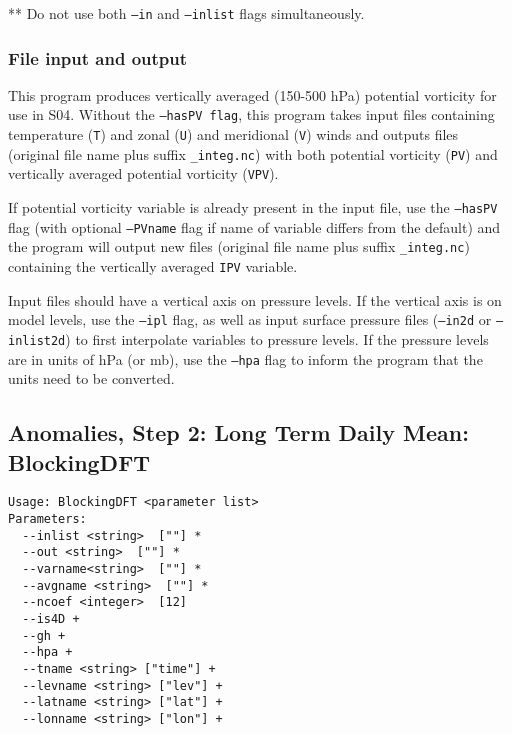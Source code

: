 \documentclass{article}
\begin{document}
** Do not use both \texttt{--in} and \texttt{--inlist} flags simultaneously.



\subsubsection{File input and output}

This program produces vertically averaged (150-500 hPa) potential vorticity for use in S04. Without the \texttt{--hasPV flag}, this program takes input files containing temperature (\texttt{T}) and zonal (\texttt{U}) and meridional (\texttt{V}) winds and outputs files  (original file name plus suffix \texttt{\_integ.nc}) with both potential vorticity (\texttt{PV}) and vertically averaged potential vorticity (\texttt{VPV}). 

If potential vorticity variable is already present in the input file,  use the \texttt{--hasPV} flag (with optional \texttt{--PVname} flag if name of variable differs from the default) and the program will output new files (original file name plus suffix \texttt{\_integ.nc}) containing the vertically averaged \texttt{IPV} variable.

Input files should have a vertical axis on pressure levels. If the vertical axis is on model levels, use the \texttt{--ipl} flag, as well as input surface pressure files (\texttt{--in2d} or \texttt{--inlist2d}) to first interpolate variables to pressure levels. If the pressure levels are in units of hPa (or mb), use the \texttt{--hpa} flag to inform the program that the units need to be converted.

\subsection{Anomalies, Step 2: Long Term Daily Mean: BlockingDFT}\label{avg}
\begin{verbatim}
Usage: BlockingDFT <parameter list>
Parameters:
  --inlist <string>  [""] *
  --out <string>  [""] *
  --varname<string>  [""] *
  --avgname <string>  [""] *
  --ncoef <integer>  [12]
  --is4D +
  --gh +
  --hpa +
  --tname <string> ["time"] +
  --levname <string> ["lev"] +
  --latname <string> ["lat"] +
  --lonname <string> ["lon"] +
\end{verbatim}
\end{document}
